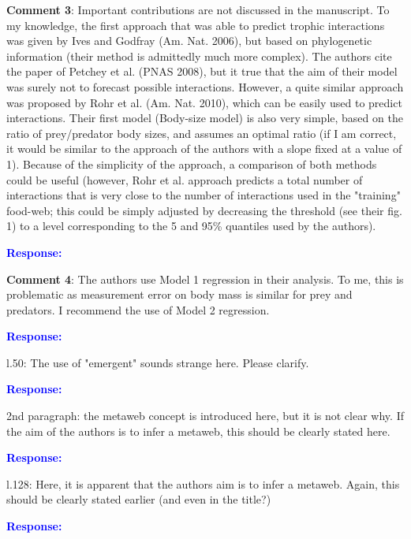 \documentclass [12pt,onecolumn,twoside,openright]{report}
\begin{document}
\begin{onehalfspacing}
\medskip \textbf{Comment 3}: Important contributions are not
discussed in the manuscript. To my knowledge, the first approach that was able
to predict trophic interactions was given by Ives and Godfray (Am. Nat. 2006),
but based on phylogenetic information (their method is admittedly much more
complex). The authors cite the paper of Petchey et al. (PNAS 2008), but it true
that the aim of their model was surely not to forecast possible interactions.
However, a quite similar approach was proposed by Rohr et al. (Am. Nat. 2010),
which can be easily used to predict interactions. Their first model (Body-size
model) is also very simple, based on the ratio of prey/predator body sizes, and
assumes an optimal ratio (if I am correct, it would be similar to the approach
of the authors with a slope fixed at a value of 1). Because of the simplicity of
the approach, a comparison of both methods could be useful (however, Rohr et al.
approach predicts a total number of interactions that is very close to the
number of interactions used in the "training" food-web; this could be simply
adjusted by decreasing the threshold (see their fig. 1) to a level corresponding
to the 5 and 95\% quantiles used by the authors).

\medskip \textcolor{blue}{\textbf{Response:}} \textit{\textcolor{blue}{}}

\medskip \textbf{Comment 4}: The authors use Model 1
regression in their analysis. To me, this is problematic as measurement error on
body mass is similar for prey and predators. I recommend the use of Model 2
regression.

\medskip \textcolor{blue}{\textbf{Response:}} \textit{\textcolor{blue}{}}

\medskip l.50: The use of "emergent" sounds strange here.
Please clarify.

\textcolor{blue}{\textbf{Response:}} \textit{\textcolor{blue}{}}

\medskip 2nd paragraph: the metaweb concept is introduced
here, but it is not clear why. If the aim of the authors is to infer a metaweb,
this should be clearly stated here.

\textcolor{blue}{\textbf{Response:}} \textit{\textcolor{blue}{}}

\medskip l.128: Here, it is apparent that the authors aim is
to infer a metaweb. Again, this should be clearly stated earlier (and even in
the title?)

\textcolor{blue}{\textbf{Response:}} \textit{\textcolor{blue}{}}


\end{onehalfspacing}
\end{document}
